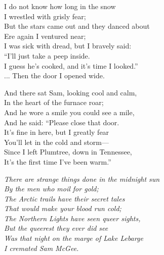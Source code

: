 \begin{poemblock}
I do not know how long in the snow\\
\idt I wrestled with grisly fear;\\
But the stars came out and they danced about\\
\idt Ere again I ventured near;\\
I was sick with dread, but I bravely said:\\
\idt “I’ll just take a peep inside.\\
I guess he’s cooked, and it’s time I looked.”\\
\idt ... Then the door I opened wide.

And there sat Sam, looking cool and calm,\\
\idt In the heart of the furnace roar;\\
And he wore a smile you could see a mile,\\
\idt And he said: “Please close that door.\\
It’s fine in here, but I greatly fear\\
\idt You’ll let in the cold and storm—\\
Since I left Plumtree, down in Tennessee,\\
\idt It’s the first time I’ve been warm.”

\textit{
There are strange things done in the midnight sun\\
\idt By the men who moil for gold;\\
The Arctic trails have their secret tales\\
\idt That would make your blood run cold;\\
The Northern Lights have seen queer sights,\\
\idt But the queerest they ever did see\\
Was that night on the marge of Lake Lebarge\\
\idt I cremated Sam McGee.
}

\end{poemblock}
